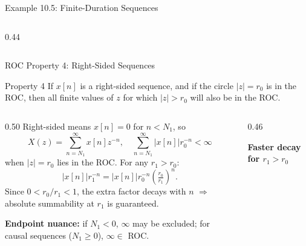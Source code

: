 \begin{frame}[t]{Example 10.5: Finite-Duration Sequences}
\begin{columns}[T]
\begin{column}{0.44\textwidth}
\begin{center}
        \vspace{0.12cm}
      \end{center}
    \end{column}
  \end{columns}
\end{frame}

\begin{frame}[t]{ROC Property 4: Right-Sided Sequences}
  \small
  \begin{conceptbox}{Property 4}
    If $x[n]$ is a right-sided sequence, and if the circle $|z|=r_0$ is in the ROC,
    then all finite values of $z$ for which $|z|>r_0$ will also be in the ROC.
  \end{conceptbox}

  \vspace{0.4cm}
  \begin{columns}[T]
    \begin{column}{0.50\textwidth}
      \footnotesize
      Right-sided means $x[n]=0$ for $n<N_1$, so
      \[
        X(z)=\sum_{n=N_1}^{\infty}x[n]z^{-n},
        \quad
        \sum_{n=N_1}^{\infty}|x[n]|r_0^{-n}<\infty
      \]
      when $|z|=r_0$ lies in the ROC. For any $r_1>r_0$:
      \[
        |x[n]|r_1^{-n}
        = |x[n]|r_0^{-n}\!\left(\tfrac{r_0}{r_1}\right)^{\!n}.
      \]
      Since $0 < r_0/r_1<1$, the extra factor decays with $n$ $\Rightarrow$ absolute summability at $r_1$ is guaranteed.

      \vspace{0.15cm}
      \textbf{Endpoint nuance:}
      if $N_1<0$, $\infty$ may be excluded; for causal sequences ($N_1\ge 0$), $\infty\in$ ROC.
    \end{column}
    \begin{column}{0.46\textwidth}
      \begin{center}
        \textbf{Faster decay for $r_1>r_0$}\\[0.15cm]
\end{center}
\end{column}
\end{columns}
\end{frame}

